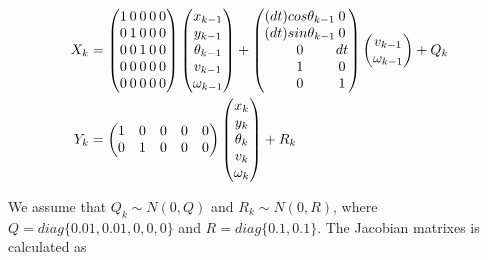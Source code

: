 \documentclass[conference]{IEEEtran}
\begin{document}
	\begin{equation}
	\begin{split}
	\begin{aligned}
	X_{k}&=
	\setlength{\arraycolsep}{1.0pt}
	\begin{pmatrix}
	1 & 0 & 0 & 0 & 0 \\
	0 & 1 & 0 & 0 & 0 \\
	0 & 0 & 1 & 0 & 0 \\
	0 & 0 & 0 & 0 & 0 \\
	0 & 0 & 0 & 0 & 0 \\
	\end{pmatrix}\begin{pmatrix}
	x_{k-1} \\
	y_{k-1} \\
	\theta_{k-1} \\
	v_{k-1} \\
	\omega_{k-1}
	\end{pmatrix}+
	\setlength{\arraycolsep}{0.2pt}
	\begin{pmatrix}
	(dt)cos\theta_{k-1} & 0 \\
	(dt)sin\theta_{k-1} & 0 \\
	0 & dt \\
	1 & 0 \\
	0 & 1 \\
	\end{pmatrix}\begin{pmatrix}
	v_{k-1} \\
	\omega_{k-1}\end{pmatrix}+Q_{k}\\
	Y_{k}&=\begin{pmatrix}
	1 &0  &0  &0  &0 \\ 
	0 &1  &0  &0  &0 
	\end{pmatrix}\begin{pmatrix}
	x_{k} \\
	y_{k} \\
	\theta_{k} \\
	v_{k} \\
	\omega_{k}
	\end{pmatrix}+R_{k}
	\label{eq30}	
	\end{aligned}
	\end{split}
	\end{equation}
	
	We assume that $Q_{k}\sim N(0,Q)$ and $R_{k}\sim N(0,R)$, where $Q=diag\{0.01,0.01,0,0,0\}$ and $R=diag\{0.1,0.1\}$. The Jacobian matrixes is calculated as
	
\end{document}

